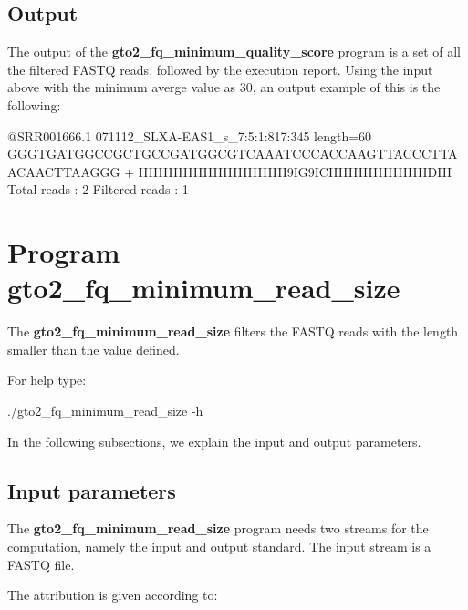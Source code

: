\documentclass[11pt,]{krantz}
\newenvironment{Shaded}{\begin{snugshade}}{\end{snugshade}}
\newcommand{\ExtensionTok}[1]{#1}
\newcommand{\NormalTok}[1]{#1}
\begin{document}
\subsection*{Output}\label{output-6}


The output of the \textbf{gto2\_fq\_minimum\_quality\_score} program is
a set of all the filtered FASTQ reads, followed by the execution report.
Using the input above with the minimum averge value as 30, an output
example of this is the following:

\begin{Shaded}
\begin{Highlighting}[]
\ExtensionTok{@SRR001666.1}\NormalTok{ 071112_SLXA-EAS1_s_7:5:1:817:345 length=60}
\ExtensionTok{GGGTGATGGCCGCTGCCGATGGCGTCAAATCCCACCAAGTTACCCTTAACAACTTAAGGG}
\ExtensionTok{+}
\ExtensionTok{IIIIIIIIIIIIIIIIIIIIIIIIIIIIII9IG9ICIIIIIIIIIIIIIIIIIIIIDIII}
\ExtensionTok{Total}\NormalTok{ reads    : 2}
\ExtensionTok{Filtered}\NormalTok{ reads : 1}
\end{Highlighting}
\end{Shaded}

\section{Program
gto2\_fq\_minimum\_read\_size}\label{program-gto2_fq_minimum_read_size}

The \textbf{gto2\_fq\_minimum\_read\_size} filters the FASTQ reads with
the length smaller than the value defined.

For help type:

\begin{Shaded}
\begin{Highlighting}[]
\ExtensionTok{./gto2_fq_minimum_read_size}\NormalTok{ -h}
\end{Highlighting}
\end{Shaded}

In the following subsections, we explain the input and output
parameters.

\subsection*{Input parameters}\label{input-parameters-7}


The \textbf{gto2\_fq\_minimum\_read\_size} program needs two streams for
the computation, namely the input and output standard. The input stream
is a FASTQ file.

The attribution is given according to:
\end{document}
